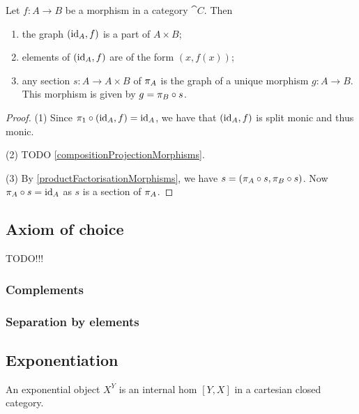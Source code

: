 \begin{proposition}
Let $f: A\to B$ be a morphism in a category $\cat{C}$. Then
\begin{enumerate}
\item the graph $(\operatorname{id}_A, f)$ is a part of $A\times B$;
\item elements of $(\operatorname{id}_A, f)$ are of the form $(x, f(x))$;
\item any section $s: A\to A\times B$ of $\pi_A$ is the graph of a unique morphism $g: A\to B$. This morphism is given by $g = \pi_B \circ s$.
\end{enumerate}
\end{proposition}
\begin{proof}
(1) Since $\pi_1\circ (\operatorname{id}_A, f) = \operatorname{id}_A$, we have that $(\operatorname{id}_A, f)$ is split monic and thus monic.

(2) TODO \ref{compositionProjectionMorphisms}.

(3) By \ref{productFactorisationMorphisms}, we have $s = (\pi_A\circ s, \pi_B\circ s)$. Now $\pi_A\circ s = \operatorname{id}_A$ as $s$ is a section of $\pi_A$.
\end{proof}

\subsection{Axiom of choice}
TODO!!!
\subsubsection{Complements}
\subsubsection{Separation by elements}

\subsection{Exponentiation}
\begin{definition}
An exponential object $X^Y$ is an internal hom $[Y,X]$ in a cartesian closed category.
\end{definition}

